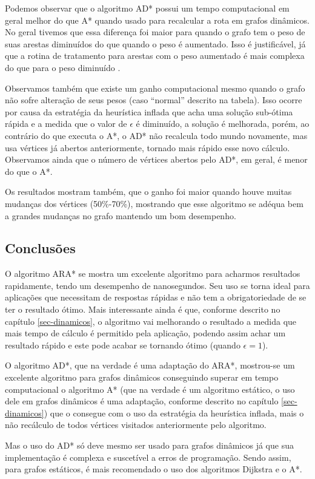 Podemos observar que o algoritmo AD* possui um tempo computacional em geral melhor do que A* quando usado para recalcular a rota em grafos dinâmicos. No geral tivemos que essa diferença foi maior para quando o grafo tem o peso de suas arestas diminuídos do que quando o peso é aumentado. Isso é justificável, já que a rotina de tratamento para arestas com o peso aumentado é mais complexa do que para o peso diminuído \cite{moura2010estudo}.

Observamos também que existe um ganho computacional mesmo quando o grafo não sofre alteração de seus pesos (caso ``normal'' descrito na tabela). Isso ocorre por causa da estratégia da heurística inflada que acha uma solução sub-ótima rápida e a medida que  o valor de $\epsilon$ é diminuído, a solução é melhorada, porém, ao contrário do que executa o A*, o AD* não recalcula todo mundo novamente, mas usa vértices já abertos anteriormente, tornado mais rápido esse novo cálculo. Observamos ainda que o número de vértices abertos pelo AD*, em geral, é menor do que o A*.

Os resultados mostram também, que o ganho foi maior quando houve muitas mudanças dos vértices (50\%-70\%), mostrando que esse algoritmo se adéqua bem a grandes mudanças no grafo mantendo um bom desempenho.

\subsection{Conclusões}
\label{sec-experimentos-dinamicos-conclusao}

O algoritmo ARA* se mostra um excelente algoritmo para acharmos resultados rapidamente, tendo um desempenho de nanosegundos. Seu uso se torna ideal para aplicações que necessitam de respostas rápidas e não tem a obrigatoriedade de se ter o resultado ótimo. Mais interessante ainda é que, conforme descrito no capítulo \ref{sec-dinamicos}, o algoritmo vai melhorando o resultado a medida que mais tempo de cálculo é permitido pela aplicação, podendo assim achar um resultado rápido e este pode acabar se tornando ótimo (quando $\epsilon = 1$).

O algoritmo AD*, que na verdade é uma adaptação do ARA*, mostrou-se um excelente algoritmo para grafos dinâmicos conseguindo superar em tempo computacional o algoritmo A* (que na verdade é um algoritmo estático, o uso dele em grafos dinâmicos é uma adaptação, conforme descrito no capítulo \ref{sec-dinamicos}) que o consegue com o uso da estratégia da heurística inflada, mais o não recálculo de todos vértices visitados anteriormente pelo algoritmo.

Mas o uso do AD* só deve mesmo ser usado para grafos dinâmicos já que sua implementação é complexa e suscetível a erros de programação. Sendo assim, para grafos estáticos, é mais recomendado o uso dos algoritmos Dijkstra e o A*.
